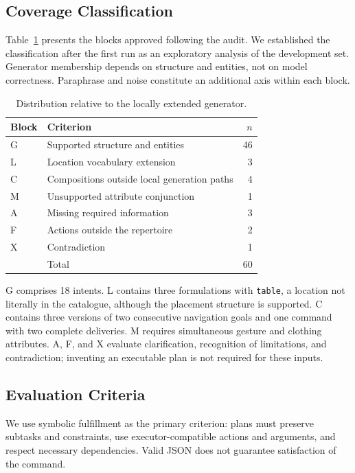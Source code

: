 \documentclass[a4paper,twoside]{article}
\begin{document}
\subsection{Coverage Classification}

Table~\ref{tab:bloques_piloto} presents the blocks approved following the audit. We established the classification after the first run as an exploratory analysis of the development set. Generator membership depends on structure and entities, not on model correctness. Paraphrase and noise constitute an additional axis within each block.

\begin{table}[htbp]
\centering\small
\caption{Distribution relative to the locally extended generator.}
\label{tab:bloques_piloto}
\begin{tabularx}{\columnwidth}{@{}l>{\raggedright\arraybackslash}Xr@{}}
\toprule
Block & Criterion & $n$ \\
\midrule
G & Supported structure and entities & 46 \\
L & Location vocabulary extension & 3 \\
C & Compositions outside local generation paths & 4 \\
M & Unsupported attribute conjunction & 1 \\
A & Missing required information & 3 \\
F & Actions outside the repertoire & 2 \\
X & Contradiction & 1 \\
\midrule
 & Total & 60 \\
\bottomrule
\end{tabularx}
\end{table}

G comprises 18 intents. L contains three formulations with \texttt{table}, a location not literally in the catalogue, although the placement structure is supported. C contains three versions of two consecutive navigation goals and one command with two complete deliveries. M requires simultaneous gesture and clothing attributes. A, F, and X evaluate clarification, recognition of limitations, and contradiction; inventing an executable plan is not required for these inputs.

\subsection{Evaluation Criteria}
We use symbolic fulfillment as the primary criterion: plans must preserve subtasks and constraints, use executor-compatible actions and arguments, and respect necessary dependencies. Valid JSON does not guarantee satisfaction of the command.
\end{document}
